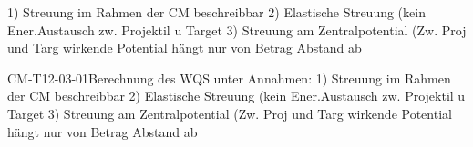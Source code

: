 1) Streuung im Rahmen der CM beschreibbar
2) Elastische Streuung (kein Ener.Austausch zw. Projektil u Target
3) Streuung am Zentralpotential (Zw. Proj und Targ wirkende Potential hängt nur von Betrag Abstand ab

\begin{REM}{CM-T12-03-01}{Berechnung des WQS unter Annahmen:
1) Streuung im Rahmen der CM beschreibbar
2) Elastische Streuung (kein Ener.Austausch zw. Projektil u Target
3) Streuung am Zentralpotential (Zw. Proj und Targ wirkende Potential hängt nur von Betrag Abstand ab}
\end{REM}
